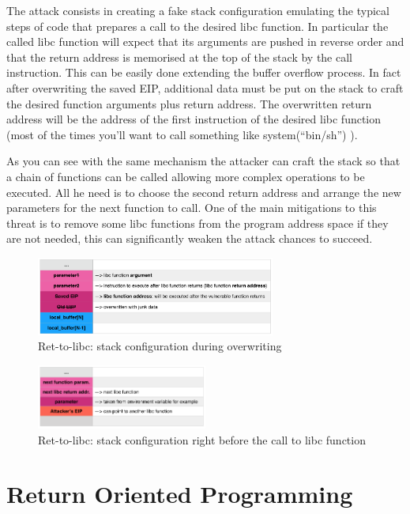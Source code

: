\documentclass[Lau,binding=0.6cm]{sapthesis}
\begin{document}
The attack consists in creating a fake stack configuration emulating the typical steps of code that prepares a call to the desired libc function. In particular the called libc function will expect that its arguments are pushed in reverse order and that the return address is memorised at the top of the stack by the call instruction.   
This can be easily done extending the buffer overflow process. In fact after overwriting the saved EIP, additional data must be put on the stack to craft the desired function arguments plus return address. The overwritten return address will be the address of the first instruction of the desired libc function (most of the times you’ll want to call something like system(“bin/sh”) ).  


As you can see with the same mechanism the attacker can craft the stack so that a chain of  functions can be called allowing more complex operations to be executed. All he need is to choose the second return address and arrange the new parameters for the next function to call.
One of the main mitigations to this threat is to remove some libc functions from the program address space if they are not needed, this can significantly weaken the attack chances to succeed.

\begin{figure}
\centering
\includegraphics[width=0.7\textwidth]{ret-to-libc1}
\caption{Ret-to-libc: stack configuration during overwriting}
\label{fig:largenenough}
\end{figure}

\begin{figure}
\centering
\includegraphics[width=0.5\textwidth]{ret-to-libc2}
\caption{Ret-to-libc: stack configuration right before the call to libc function}
\label{fig:largenenough}
\end{figure}

\section{Return Oriented Programming}
\end{document}
